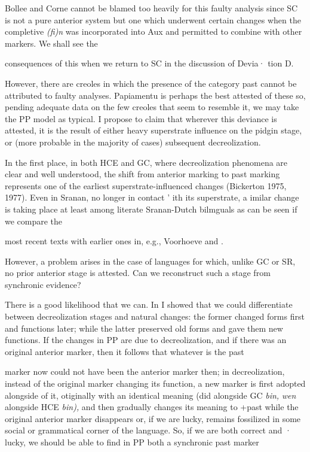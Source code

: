 Bollee and Corne cannot be blamed too heavily for this faulty analysis since SC is not a pure anterior system but one which under\-went certain changes when the completive \textit{(fi)n} was incorporated into Aux and permitted to combine with other markers. We shall see the

consequences of this when we return to SC in the discussion of Devia· tion D.

However, there are creoles in which the presence of the category past cannot be attributed to faulty analyses. Papiamentu is perhaps the best attested of these so, pending adequate data on the few creoles that seem to resemble it, we may take the PP model as typical. I pro\-pose to claim that wherever this deviance is attested, it is the result of either heavy superstrate influence on the pidgin stage, or (more prob\-able in the majority of cases) subsequent decreolization.

In the first place, in both HCE and GC, where decreolization phenomena are clear and well understood, the shift from anterior mark\-ing to past marking represents one of the earliest superstrate-influenced changes (Bickerton 1975, 1977). Even in Sranan, no longer in contact ' ith its superstrate, a imilar change is taking place at least among literate Sranan-Dutch bilmguals as can be seen if we compare the

most recent texts with earlier ones in, e.g., Voorhoeve and \citet{Lichtveld1976}.

However, a problem arises in the case of languages for which, unlike GC or SR, no prior anterior stage is attested. Can we reconstruct such a stage from synchronic evidence?

There is a good likelihood that we can. In \citet{Bickerton1980} I showed that we could differentiate between decreolization stages and natural changes: the former changed forms first and functions later; while the latter preserved old forms and gave them new functions. If the changes in PP are due to decreolization, and if there was an original anterior marker, then it follows that whatever is the past


marker now could not have been the anterior marker then; in decreoli\-zation, instead of the original marker changing its function, a new marker is first adopted alongside of it, otiginally with an identical meaning (did alongside GC \textit{bin,} \textit{wen }alongside HCE \textit{bin}\textit{),} and then gradually changes its meaning to +past while the original anterior marker disappears or, if we are lucky, remains fossilized in some social or grammatical corner of the language. So, if we are both correct and · lucky, we should be able to find in PP both a synchronic past marker

